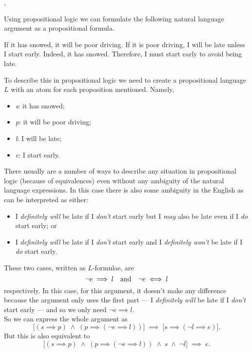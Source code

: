\documentclass[../MathsNotesBase.tex]{subfiles}
\begin{document}
{ 
 		
		
		\sep
		\begin{exe}
			\ex Using propositional logic we can formulate the following natural language argument as a propositional formula.
				\begin{displayquote}
					If it has snowed, it will be poor driving. If it is poor driving, I will be late unless I start early. Indeed, it has snowed. Therefore, I must start early to avoid being late.
				\end{displayquote}
				To describe this in propositional logic we need to create a propositional language $L$ with an atom for each proposition mentioned. Namely,
				\begin{itemize}
					\item \textit{s}: it has snowed;
					\item \textit{p}: it will be poor driving;
					\item \textit{l}: I will be late;
					\item \textit{e}: I start early.
				\end{itemize}
				There usually are a number of ways to describe any situation in propositional logic (because of equivalences) even without any ambiguity of the natural language expressions. In this case there is also some ambiguity in the English as  can be interpreted as either:
				\begin{itemize}
					\item I \textit{definitely will} be late if I \textit{don't} start early but I \textit{may} also be late even if I \textit{do} start early; or
					\item I \textit{definitely will} be late if I \textit{don't} start early and I \textit{definitely won't} be late if I \textit{do} start early.
				\end{itemize}
				These two cases, written as $L$-formulae, are
				\[ \lnot e \implies l  \hspace{10pt}\text{and}\hspace{10pt}  \lnot e \iff l \]
				respectively. In this case, for this argument, it doesn't make any difference because the argument only uses the first part --- I \textit{definitely will} be late if I \textit{don't} start early --- and so we only need ${ \lnot e \implies l }$.\\
				
				So we can express the whole argument as
				\[ \big[(s \implies p) \; \land \; (p \implies (\lnot e \implies l)) \big] \; \implies \; \big[s \implies (\lnot l \implies e) \big]. \]
				But this is also equivalent to
				\[ \big[(s \implies p) \; \land \; (p \implies (\lnot e \implies l)) \; \land \; s \; \land \; \lnot l \big] \; \implies \; e. \tag{*} \]
				

\end{exe}}
\end{document}
